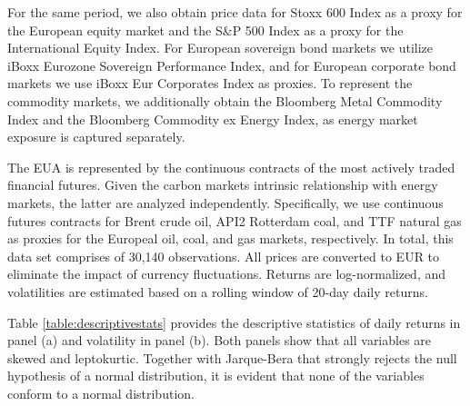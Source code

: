 \documentclass[preprint, 3p,
authoryear]{elsarticle} %
\begin{document}
For the same period, we also obtain price data for Stoxx 600 Index as a
proxy for the European equity market and the S\&P 500 Index as a proxy
for the International Equity Index. For European sovereign bond markets
we utilize iBoxx Eurozone Sovereign Performance Index, and for European
corporate bond markets we use iBoxx Eur Corporates Index as proxies. To
represent the commodity markets, we additionally obtain the Bloomberg
Metal Commodity Index and the Bloomberg Commodity ex Energy Index, as
energy market exposure is captured separately.

The EUA is represented by the continuous contracts of the most actively
traded financial futures. Given the carbon markets intrinsic
relationship with energy markets, the latter are analyzed independently.
Specifically, we use continuous futures contracts for Brent crude oil,
API2 Rotterdam coal, and TTF natural gas as proxies for the Europeal
oil, coal, and gas markets, respectively. In total, this data set
comprises of 30,140 observations. All prices are converted to EUR to
eliminate the impact of currency fluctuations. Returns are
log-normalized, and volatilities are estimated based on a rolling window
of 20-day daily returns.

Table \ref{table:descriptivestats} provides the descriptive statistics
of daily returns in panel (a) and volatility in panel (b). Both panels
show that all variables are skewed and leptokurtic. Together with
Jarque-Bera that strongly rejects the null hypothesis of a normal
distribution, it is evident that none of the variables conform to a
normal distribution.\\
\end{document}
